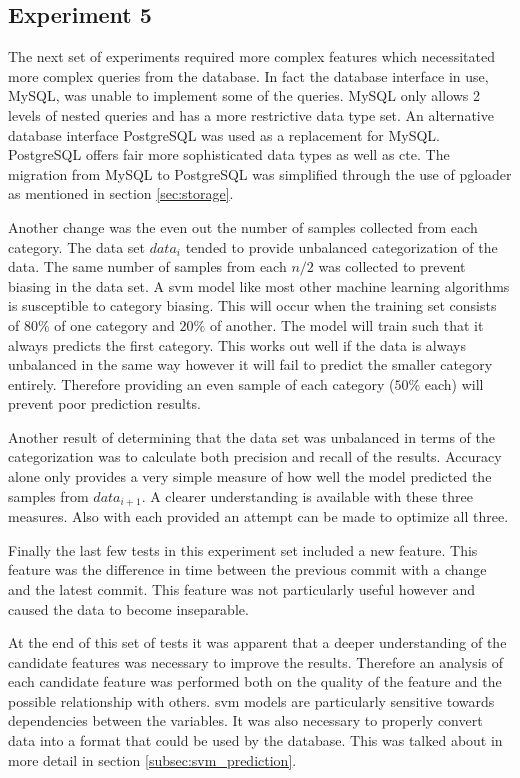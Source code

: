 \subsection{Experiment 5}

The next set of experiments required more complex features which necessitated more complex queries from the database. In fact the database interface in use, MySQL, was unable to implement some of the queries. MySQL only allows 2 levels of nested queries and has a more restrictive data type set. An alternative database interface PostgreSQL was used as a replacement for MySQL. PostgreSQL offers fair more sophisticated data types as well as \gls{cte}. The migration from MySQL to PostgreSQL was simplified through the use of pgloader as mentioned in section \ref{sec:storage}. 

Another change was the even out the number of samples collected from each category. The data set $data_i$ tended to provide unbalanced categorization of the data. The same number of samples from each $n/2$ was collected to prevent biasing in the data set. A \gls{svm} model like most other machine learning algorithms is susceptible to category biasing. This will occur when the training set consists of $80\%$ of one category and $20\%$ of another. The model will train such that it always predicts the first category. This works out well if the data is always unbalanced in the same way however it will fail to predict the smaller category entirely. Therefore providing an even sample of each category ($50\%$ each) will prevent poor prediction results.

Another result of determining that the data set was unbalanced in terms of the categorization was to calculate both precision and recall of the results. Accuracy alone only provides a very simple measure of how well the model predicted the samples from $data_{i+1}$. A clearer understanding is available with these three measures. Also with each provided an attempt can be made to optimize all three.

Finally the last few tests in this experiment set included a new feature. This feature was the difference in time between the previous commit with a change and the latest commit. This feature was not particularly useful however and caused the data to become inseparable.

At the end of this set of tests it was apparent that a deeper understanding of the candidate features was necessary to improve the results. Therefore an analysis of each candidate feature was performed both on the quality of the feature and the possible relationship with others. \gls{svm} models are particularly sensitive towards dependencies between the variables. It was also necessary to properly convert data into a format that could be used by the database. This was talked about in more detail in section \ref{subsec:svm_prediction}.

